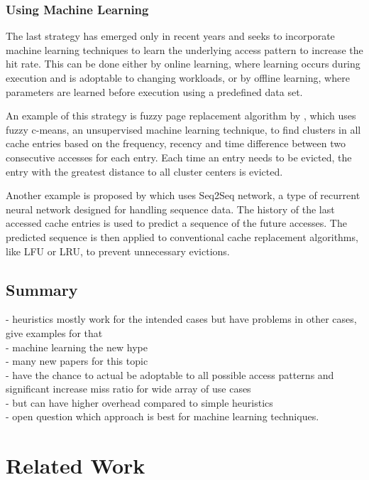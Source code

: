 \documentclass[
	12pt,
	a4paper,
	abstract,
	bibliography=totoc,
	chapterprefix,
	headings=openright,
	numbers=endperiod,
	parskip=half,
	twoside,
]{scrreprt}
\begin{document}
\subsection{Using Machine Learning}

The last strategy has emerged only in recent years and seeks to incorporate machine learning techniques to learn the underlying access pattern to increase the hit rate.
This can be done either by online learning, where learning occurs during execution and is adoptable to changing workloads, or by offline learning, where parameters are learned before execution using a predefined data set.

An example of this strategy is fuzzy page replacement algorithm by \cite{akbari2020page}, which uses
fuzzy c-means, an unsupervised machine learning technique, to find clusters in all cache entries based on the frequency, recency and time difference between two consecutive accesses for each entry.
Each time an entry needs to be evicted, the entry with the greatest distance to all cluster centers is evicted.

Another example is proposed by \cite{choi2022learning} which uses Seq2Seq network, a type of recurrent neural network designed for handling sequence data.
The history of the last accessed cache entries is used to predict a sequence of the future accesses.
The predicted sequence is then applied to conventional cache replacement algorithms, like LFU or LRU, to prevent unnecessary evictions. 


\section{Summary}
\label{sec:summary}

- heuristics mostly work for the intended cases but have problems in other cases, give examples for that\\
- machine learning the new hype\\
- many new papers for this topic \\
- have the chance to actual be adoptable to all possible access patterns and significant increase miss ratio for wide array of use cases \\
- but can have higher overhead compared to simple heuristics\\
- open question which approach is best for machine learning techniques.

\chapter{Related Work}
\label{cha:related work}
\end{document}
